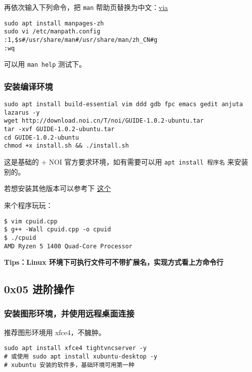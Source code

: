 再依次输入下列命令，把 \texttt{man} 帮助页替换为中文：\href{https://blog.csdn.net/qq_14989227/article/details/72954523}{via}

\begin{verbatim}
sudo apt install manpages-zh
sudo vi /etc/manpath.config
:1,$s#/usr/share/man#/usr/share/man/zh_CN#g
:wq
\end{verbatim}

 可以用 \texttt{man help} 测试下。

\subsubsection{安装编译环境}

\begin{verbatim}
sudo apt install build-essential vim ddd gdb fpc emacs gedit anjuta lazarus -y
wget http://download.noi.cn/T/noi/GUIDE-1.0.2-ubuntu.tar
tar -xvf GUIDE-1.0.2-ubuntu.tar
cd GUIDE-1.0.2-ubuntu
chmod +x install.sh && ./install.sh
\end{verbatim}

这是基础的 + NOI 官方要求环境，如有需要可以用 \texttt{apt install 程序名} 来安装别的。

若想安装其他版本可以参考下 \href{https://www.cnblogs.com/EasonJim/p/7144017.html}{这个}

来个程序玩玩：

\begin{verbatim}
$ vim cpuid.cpp
$ g++ -Wall cpuid.cpp -o cpuid
$ ./cpuid
AMD Ryzen 5 1400 Quad-Core Processor
\end{verbatim}

\textbf{Tips：Linux 环境下可执行文件可不带扩展名，实现方式看上方命令行 }

\subsection{0x05 进阶操作}

\subsubsection{安装图形环境，并使用远程桌面连接}

推荐图形环境用 xfce4，不臃肿。

\begin{verbatim}
sudo apt install xfce4 tightvncserver -y
# 或使用 sudo apt install xubuntu-desktop -y
# xubuntu 安装的软件多，基础环境可用第一种
\end{verbatim}


